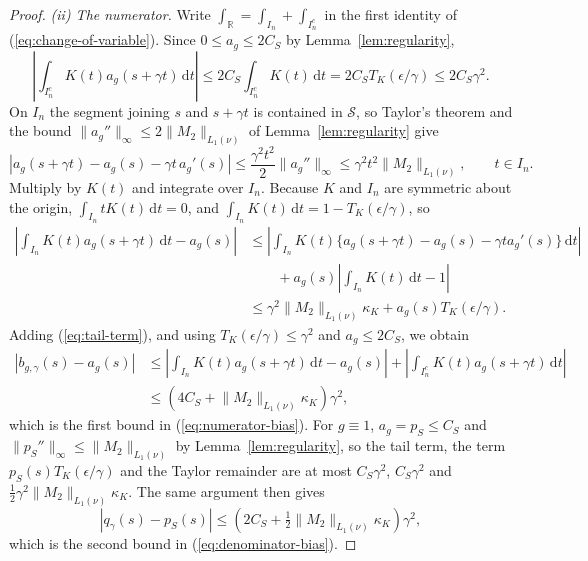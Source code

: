 \documentclass{article} %
\begin{document}
\begin{proof}
\emph{(ii) The numerator.}  Write $\int_{\mathbb{R}}=\int_{I_n}+\int_{I_n^c}$ in the first identity of (\ref{eq:change-of-variable}).  Since $0\le a_g\le2C_S$ by Lemma~\ref{lem:regularity},
\begin{equation}
  \left|\int_{I_n^c}K(t)a_g(s+\gamma t)\,\mathrm{d}t\right|
  \le2C_S\int_{I_n^c}K(t)\,\mathrm{d}t
  =2C_ST_K(\epsilon/\gamma)\le2C_S\gamma^2 .
  \label{eq:tail-term}
\end{equation}
On $I_n$ the segment joining $s$ and $s+\gamma t$ is contained in $\mathcal{S}$, so Taylor's theorem and the bound $\lVert a_g''\rVert_\infty\le2\lVert M_2\rVert_{L_1(\nu)}$ of Lemma~\ref{lem:regularity} give
\[
  \left|a_g(s+\gamma t)-a_g(s)-\gamma t\,a_g'(s)\right|
  \le\frac{\gamma^2t^2}{2}\lVert a_g''\rVert_\infty
  \le\gamma^2t^2\lVert M_2\rVert_{L_1(\nu)},
  \qquad t\in I_n .
\]
Multiply by $K(t)$ and integrate over $I_n$.  Because $K$ and $I_n$ are symmetric about the origin, $\int_{I_n}tK(t)\,\mathrm{d}t=0$, and $\int_{I_n}K(t)\,\mathrm{d}t=1-T_K(\epsilon/\gamma)$, so
\[
\begin{aligned}
  \left|\int_{I_n}K(t)a_g(s+\gamma t)\,\mathrm{d}t-a_g(s)\right|
  &\le\left|\int_{I_n}K(t)\{a_g(s+\gamma t)-a_g(s)-\gamma ta_g'(s)\}\,\mathrm{d}t\right|
  \\
  &\qquad+a_g(s)\left|\int_{I_n}K(t)\,\mathrm{d}t-1\right|
  \\
  &\le\gamma^2\lVert M_2\rVert_{L_1(\nu)}\kappa_K+a_g(s)T_K(\epsilon/\gamma) .
\end{aligned}
\]
Adding (\ref{eq:tail-term}), and using $T_K(\epsilon/\gamma)\le\gamma^2$ and $a_g\le2C_S$, we obtain
\begin{equation}
\begin{aligned}
  \left|b_{g,\gamma}(s)-a_g(s)\right|
  &\le\left|\int_{I_n}K(t)a_g(s+\gamma t)\,\mathrm{d}t-a_g(s)\right|
   +\left|\int_{I_n^c}K(t)a_g(s+\gamma t)\,\mathrm{d}t\right|
  \\
  &\le\left(4C_S+\lVert M_2\rVert_{L_1(\nu)}\kappa_K\right)\gamma^2 ,
\end{aligned}
  \label{eq:numerator-explicit}
\end{equation}
which is the first bound in (\ref{eq:numerator-bias}).  For $g\equiv1$, $a_g=p_S\le C_S$ and $\lVert p_S''\rVert_\infty\le\lVert M_2\rVert_{L_1(\nu)}$ by Lemma~\ref{lem:regularity}, so the tail term, the term $p_S(s)T_K(\epsilon/\gamma)$ and the Taylor remainder are at most $C_S\gamma^2$, $C_S\gamma^2$ and $\tfrac12\gamma^2\lVert M_2\rVert_{L_1(\nu)}\kappa_K$.  The same argument then gives
\begin{equation}
  \left|q_{\gamma}(s)-p_S(s)\right|
  \le\left(2C_S+\tfrac12\lVert M_2\rVert_{L_1(\nu)}\kappa_K\right)\gamma^2 ,
  \label{eq:denominator-explicit}
\end{equation}
which is the second bound in (\ref{eq:denominator-bias}).


\end{proof}
\end{document}

